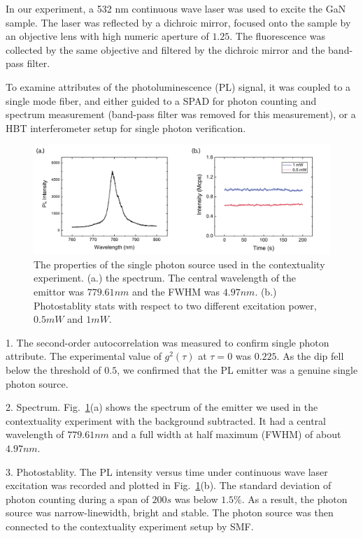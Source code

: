 \documentclass[pra,aps,notitlepage,superscriptaddress,showpacs,showkeys]{revtex4-1}
\theoremstyle{definition}
\theoremstyle{remark}
\begin{document}
 In our experiment, a 532 nm continuous wave laser was used to excite the GaN sample. The laser was reflected by a dichroic mirror, focused onto the sample by an objective lens with high numeric aperture of $1.25$. The fluorescence was collected by the same objective and filtered by the dichroic mirror and the band-pass filter.

 To examine attributes of the photoluminescence (PL) signal, it was coupled to a single mode fiber, and either guided to a SPAD for photon counting and spectrum measurement (band-pass filter was removed for this measurement), or a HBT interferometer setup for single photon verification.

 \begin{figure}[t]
     \centering
     \includegraphics[width = .96 \linewidth]{fig/exp-sauce.pdf}
     \caption{The properties of the single photon source used in the contextuality experiment. (a.) the spectrum. The central wavelength of the emittor was $779.61nm$ and the FWHM was $4.97nm$. (b.) Photostablity stats with respect to two different excitation power, $0.5mW$ and $1mW$.}
     \label{fig:exp-sauce}
 \end{figure}

 1. The second-order autocorrelation was measured to confirm single photon attribute. The experimental value of $g^2(\tau)$ at $\tau = 0$ was $0.225$. As the dip fell below the threshold of $0.5$, we confirmed that the PL emitter was a genuine single photon source.

 2. Spectrum. Fig.~\ref{fig:exp-sauce}(a) shows the spectrum of the emitter we used in the contextuality experiment with the background subtracted. It had a central wavelength of $779.61nm$ and a full width at half maximum (FWHM) of about $4.97nm$.

 3. Photostablity. The PL intensity versus time under continuous wave laser excitation was recorded and plotted in Fig.~\ref{fig:exp-sauce}(b). The standard deviation of photon counting during a span of $200s$ was below $1.5\%$.
 As a result, the photon source was narrow-linewidth, bright and stable. The photon source was then connected to the contextuality experiment setup by SMF.
\end{document}
